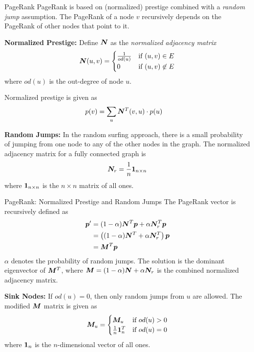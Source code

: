 \begin{frame}{PageRank}
PageRank is based on (normalized) prestige combined with a 
{\em random jump} assumption. 
The PageRank of
a node $v$ recursively depends on the PageRank of other nodes that
point to it.

\medskip
{\bf Normalized Prestige:}
Define ${\boldsymbol N}$ as the {\em normalized adjacency matrix}
\begin{align*}
  {\boldsymbol N}(u,v) =
  \begin{cases}
    \frac{1}{od(u)} & \mbox{if } (u,v) \in E\\
    0 & \mbox{if } (u,v) \not\in E
  \end{cases}
\end{align*}
where $od(u)$ is the out-degree of node $u$.

Normalized prestige is given as
\begin{align*}
  p(v)  & = \sum_u {\boldsymbol N}^T(v,u) \cdot p(u)
\end{align*}


\medskip
{\bf Random Jumps:}
In the random surf\/{i}ng approach, there is a small probability of
jumping from one node to any of the other nodes in the graph.
The normalized adjacency matrix for a fully connected graph is 
$${\boldsymbol N}_r = {1\over n} \mathbf{1}_{n \times n}$$
where $\mathbf{1}_{n \times n}$ is the $n\times n$ matrix of all ones.
\end{frame}


\begin{frame}{PageRank: Normalized Prestige and Random Jumps}
The PageRank vector is recursively defined as
\begin{align*}
  {\boldsymbol p}' & = (1-\alpha) {\boldsymbol N}^T {\boldsymbol p} + \alpha {\boldsymbol N}_r^T {\boldsymbol p} \\
    & = \left((1-\alpha) {\boldsymbol N}^T + \alpha{\boldsymbol N}_r^T \right) {\boldsymbol p}\\
    & = {\boldsymbol M}^T {\boldsymbol p}
\end{align*}
$\alpha$ denotes the probability of random jumps.
The solution is the dominant eigenvector of ${\boldsymbol M}^T$, where 
${\boldsymbol M} = (1-\alpha) {\boldsymbol N} +
\alpha{\boldsymbol N}_r$ is the combined normalized
adjacency matrix.

\medskip
{\bf Sink Nodes:} If $od(u) = 0$, then only random jumps from $u$ are
allowed. The modified ${\boldsymbol M}$ matrix is given as
\begin{align*}
    {\boldsymbol M}_u =
    \begin{cases}
        {\boldsymbol M}_u & \text{if } od(u)>0\\
        {1\over n}\mathbf{1}_n^T & \text{if } od(u)=0
    \end{cases}
\end{align*}
where $\mathbf{1}_n$ is the $n$-dimensional vector of all ones.
\end{frame}


